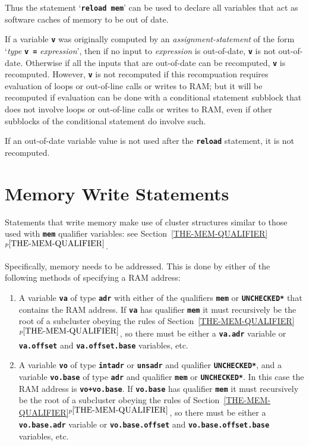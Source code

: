 \documentclass[12pt]{article}
\newcommand{\TT}[1]{{\tt \bfseries #1}}
\newcommand{\itemref}[1]{\ref{#1}$^{p\pageref{#1}}$}
\newcommand{\EOL}{\penalty \exhyphenpenalty}
\begin{document}
Thus the statement `\TT{reload mem}' can be used to declare all
variables that act as software caches of memory to be out of date.

If a variable \TT{v} was originally computed by
an {\em assignment-statement}
of the form `{\em type} \TT{v =} {\em expression}', then if
no input to {\em expression} is out-of-date, \TT{v} is not out-of-date.
Otherwise if all the inputs that are out-of-date can be recomputed,
\TT{v} is recomputed.  However, \TT{v} is not recomputed if this
recompuation requires evaluation of loops or out-of-line calls or
writes to RAM;
but it will be recomputed if evaluation can be done with a conditional
statement subblock that does not involve loops or out-of-line calls or
writes to RAM,
even if other subblocks of the conditional statement do involve such.

If an out-of-date variable value is not used after the \TT{reload} statement,
it is not recomputed.

\section{Memory Write Statements}
\label{MEMORY-WRITE-STATEMENTS}

Statements that write memory make use of cluster structures
similar to those used with
\TT{mem} qualifier variables:
see Section~\itemref{THE-MEM-QUALIFIER}.

Specifically, memory needs to be addressed.  This is done by either
of the following methods of specifying a RAM address:
\begin{enumerate}
\item
A variable \TT{va} of type \TT{adr} with either of the qualifiers
\TT{mem} or \TT{*UNCHECKED*} that contains the RAM address.
If \TT{va} has qualifier \TT{mem} it must recursively be
the root of a subcluster obeying
the rules of Section~\itemref{THE-MEM-QUALIFIER},
so there must be either a \TT{va.adr} variable
or \TT{va.offset} and \TT{va.offset\EOL .base}
variables, etc.


\item
A variable \TT{vo} of type \TT{intadr} or \TT{unsadr} and
qualifier \TT{*UNCHECKED*}, and
a variable \TT{vo.base} of type \TT{adr} and qualifier \TT{mem}
or \TT{*UNCHECKED*}.
In this case the RAM address is \TT{vo+vo.base}.
If \TT{vo.base} has qualifier \TT{mem} it must recursively be
the root of a subcluster obeying
the rules of Section~\itemref{THE-MEM-QUALIFIER},
so there must be either a \TT{vo.base.adr} variable
or \TT{vo.base.offset} and \TT{vo.base.offset\EOL .base}
variables, etc.

\end{enumerate}
\end{document}
